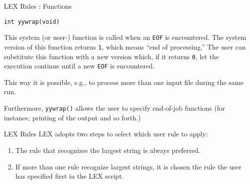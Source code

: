 \begin{frame}[fragile]{LEX Rules : Functions}
\begin{center}\tt int yywrap(void)\end{center}\label{yywrap}


\vspace{20pt}

This system (or user-) function is called when an {\tt EOF}
is encountered. The system version of this function returns
{\tt 1}, which means ``end of processing.''
The user can substitute this function with a new version
which, if it returns {\tt 0}, let the execution
continue until a new  {\tt EOF} is encountered. 


\vspace{20pt}

This way it is possible, e.g., to process more than one
input file during the same run.


\vspace{20pt}

Furthermore, {\tt yywrap()} allows the user to specify
end-of-job functions (for instance, printing of the
output and so forth.)



\end{frame}

\begin{frame}[fragile]{LEX Rules}
LEX adopts two steps to select which user rule to apply:


\vspace{20pt}

\begin{enumerate}
\item The rule that recognizes the largest string is always preferred.
\item If more than one rule recognize largest strings, it is chosen
      the rule the user has specified first in the LEX script.
\end{enumerate}
\end{frame}

%
%
%
%
%


